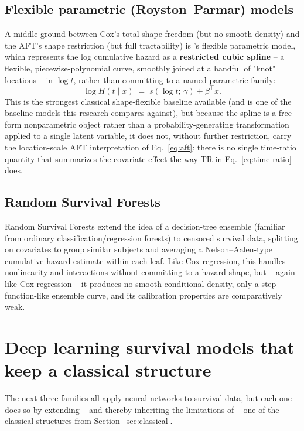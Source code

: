 \documentclass[11pt]{article}
\begin{document}
\subsection{Flexible parametric (Royston--Parmar) models}
A middle ground between Cox's total shape-freedom (but no smooth density)
and the AFT's shape restriction (but full tractability) is
\citet{royston2002}'s flexible parametric model, which represents the log
cumulative hazard as a \textbf{restricted cubic spline} -- a flexible,
piecewise-polynomial curve, smoothly joined at a handful of "knot"
locations -- in $\log t$, rather than committing to a named parametric
family:
\[
  \log H(t \mid x) \;=\; s(\log t;\, \gamma) + \beta^\top x.
\]
This is the strongest classical shape-flexible baseline available (and is
one of the baseline models this research compares against), but because
the spline is a free-form nonparametric object rather than a
probability-generating transformation applied to a single latent
variable, it does not, without further restriction, carry the
location-scale AFT interpretation of Eq.~\eqref{eq:aft}: there is no
single time-ratio quantity that summarizes the covariate effect the way
$\mathrm{TR}$ in Eq.~\eqref{eq:time-ratio} does.

\subsection{Random Survival Forests}
Random Survival Forests \citep{ishwaran2008rsf} extend the idea of a
decision-tree ensemble (familiar from ordinary classification/regression
forests) to censored survival data, splitting on covariates to group
similar subjects and averaging a Nelson--Aalen-type cumulative hazard
estimate within each leaf. Like Cox regression, this handles nonlinearity
and interactions without committing to a hazard shape, but -- again like
Cox regression -- it produces no smooth conditional density, only a
step-function-like ensemble curve, and its calibration properties are
comparatively weak.

\section{Deep learning survival models that keep a classical structure}
\label{sec:dl}

The next three families all apply neural networks to survival data, but
each one does so by extending -- and thereby inheriting the limitations
of -- one of the classical structures from Section~\ref{sec:classical}.
\end{document}
